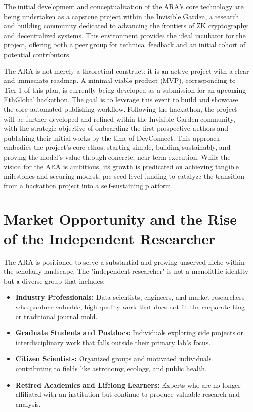 \documentclass[conference, compsoc, 11pt]{IEEEtran}
\begin{document}
The initial development and conceptualization of the ARA's core technology are being undertaken as a capstone project within the Invisible Garden, a research and building community dedicated to advancing the frontiers of ZK cryptography and decentralized systems. This environment provides the ideal incubator for the project, offering both a peer group for technical feedback and an initial cohort of potential contributors.

The ARA is not merely a theoretical construct; it is an active project with a clear and immediate roadmap. A minimal viable product (MVP), corresponding to Tier 1 of this plan, is currently being developed as a submission for an upcoming EthGlobal hackathon. The goal is to leverage this event to build and showcase the core automated publishing workflow. Following the hackathon, the project will be further developed and refined within the Invisible Garden community, with the strategic objective of onboarding the first prospective authors and publishing their initial works by the time of DevConnect. This approach embodies the project's core ethos: starting simple, building sustainably, and proving the model's value through concrete, near-term execution. While the vision for the ARA is ambitious, its growth is predicated on achieving tangible milestones and securing modest, pre-seed level funding to catalyze the transition from a hackathon project into a self-sustaining platform.

\section{Market Opportunity and the Rise of the Independent Researcher}

The ARA is positioned to serve a substantial and growing unserved niche within the scholarly landscape. The "independent researcher" is not a monolithic identity but a diverse group that includes:
\begin{itemize}
    \item \textbf{Industry Professionals:} Data scientists, engineers, and market researchers who produce valuable, high-quality work that does not fit the corporate blog or traditional journal mold.
    \item \textbf{Graduate Students and Postdocs:} Individuals exploring side projects or interdisciplinary work that falls outside their primary lab's focus.
    \item \textbf{Citizen Scientists:} Organized groups and motivated individuals contributing to fields like astronomy, ecology, and public health.
    \item \textbf{Retired Academics and Lifelong Learners:} Experts who are no longer affiliated with an institution but continue to produce valuable research and analysis.
\end{itemize}
\end{document}
